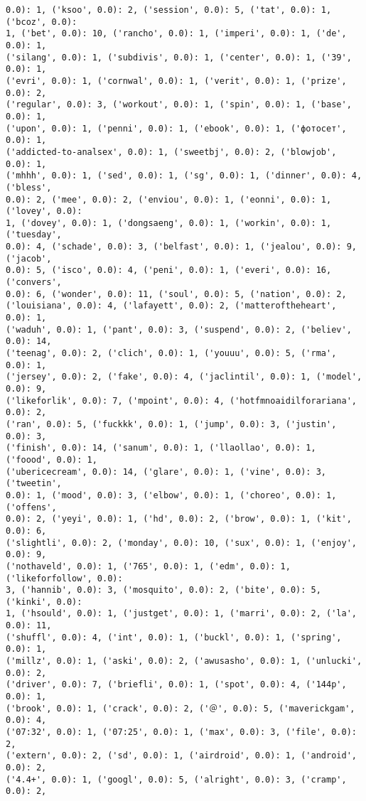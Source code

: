 \documentclass[11pt]{article}
\begin{document}
\begin{Verbatim}[commandchars=\\\{\}]
0.0): 1, ('ksoo', 0.0): 2, ('session', 0.0): 5, ('tat', 0.0): 1, ('bcoz', 0.0):
1, ('bet', 0.0): 10, ('rancho', 0.0): 1, ('imperi', 0.0): 1, ('de', 0.0): 1,
('silang', 0.0): 1, ('subdivis', 0.0): 1, ('center', 0.0): 1, ('39', 0.0): 1,
('evri', 0.0): 1, ('cornwal', 0.0): 1, ('verit', 0.0): 1, ('prize', 0.0): 2,
('regular', 0.0): 3, ('workout', 0.0): 1, ('spin', 0.0): 1, ('base', 0.0): 1,
('upon', 0.0): 1, ('penni', 0.0): 1, ('ebook', 0.0): 1, ('фотосет', 0.0): 1,
('addicted-to-analsex', 0.0): 1, ('sweetbj', 0.0): 2, ('blowjob', 0.0): 1,
('mhhh', 0.0): 1, ('sed', 0.0): 1, ('sg', 0.0): 1, ('dinner', 0.0): 4, ('bless',
0.0): 2, ('mee', 0.0): 2, ('enviou', 0.0): 1, ('eonni', 0.0): 1, ('lovey', 0.0):
1, ('dovey', 0.0): 1, ('dongsaeng', 0.0): 1, ('workin', 0.0): 1, ('tuesday',
0.0): 4, ('schade', 0.0): 3, ('belfast', 0.0): 1, ('jealou', 0.0): 9, ('jacob',
0.0): 5, ('isco', 0.0): 4, ('peni', 0.0): 1, ('everi', 0.0): 16, ('convers',
0.0): 6, ('wonder', 0.0): 11, ('soul', 0.0): 5, ('nation', 0.0): 2,
('louisiana', 0.0): 4, ('lafayett', 0.0): 2, ('matteroftheheart', 0.0): 1,
('waduh', 0.0): 1, ('pant', 0.0): 3, ('suspend', 0.0): 2, ('believ', 0.0): 14,
('teenag', 0.0): 2, ('clich', 0.0): 1, ('youuu', 0.0): 5, ('rma', 0.0): 1,
('jersey', 0.0): 2, ('fake', 0.0): 4, ('jaclintil', 0.0): 1, ('model', 0.0): 9,
('likeforlik', 0.0): 7, ('mpoint', 0.0): 4, ('hotfmnoaidilforariana', 0.0): 2,
('ran', 0.0): 5, ('fuckkk', 0.0): 1, ('jump', 0.0): 3, ('justin', 0.0): 3,
('finish', 0.0): 14, ('sanum', 0.0): 1, ('llaollao', 0.0): 1, ('foood', 0.0): 1,
('ubericecream', 0.0): 14, ('glare', 0.0): 1, ('vine', 0.0): 3, ('tweetin',
0.0): 1, ('mood', 0.0): 3, ('elbow', 0.0): 1, ('choreo', 0.0): 1, ('offens',
0.0): 2, ('yeyi', 0.0): 1, ('hd', 0.0): 2, ('brow', 0.0): 1, ('kit', 0.0): 6,
('slightli', 0.0): 2, ('monday', 0.0): 10, ('sux', 0.0): 1, ('enjoy', 0.0): 9,
('nothaveld', 0.0): 1, ('765', 0.0): 1, ('edm', 0.0): 1, ('likeforfollow', 0.0):
3, ('hannib', 0.0): 3, ('mosquito', 0.0): 2, ('bite', 0.0): 5, ('kinki', 0.0):
1, ('hsould', 0.0): 1, ('justget', 0.0): 1, ('marri', 0.0): 2, ('la', 0.0): 11,
('shuffl', 0.0): 4, ('int', 0.0): 1, ('buckl', 0.0): 1, ('spring', 0.0): 1,
('millz', 0.0): 1, ('aski', 0.0): 2, ('awusasho', 0.0): 1, ('unlucki', 0.0): 2,
('driver', 0.0): 7, ('briefli', 0.0): 1, ('spot', 0.0): 4, ('144p', 0.0): 1,
('brook', 0.0): 1, ('crack', 0.0): 2, ('＠', 0.0): 5, ('maverickgam', 0.0): 4,
('07:32', 0.0): 1, ('07:25', 0.0): 1, ('max', 0.0): 3, ('file', 0.0): 2,
('extern', 0.0): 2, ('sd', 0.0): 1, ('airdroid', 0.0): 1, ('android', 0.0): 2,
('4.4+', 0.0): 1, ('googl', 0.0): 5, ('alright', 0.0): 3, ('cramp', 0.0): 2,

\end{Verbatim}
\end{document}
